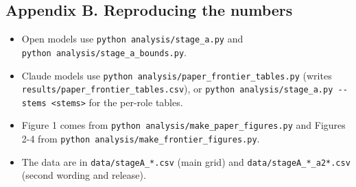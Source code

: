 \documentclass[
  11pt,
]{article}
\providecommand{\tightlist}{%
  \setlength{\itemsep}{0pt}\setlength{\parskip}{0pt}}
\begin{document}
\hypertarget{appendix-b.-reproducing-the-numbers}{%
\subsection{Appendix B. Reproducing the
numbers}\label{appendix-b.-reproducing-the-numbers}}

\begin{itemize}
\tightlist
\item
  Open models use \texttt{python\ analysis/stage\_a.py} and
  \texttt{python\ analysis/stage\_a\_bounds.py}.
\item
  Claude models use \texttt{python\ analysis/paper\_frontier\_tables.py}
  (writes \texttt{results/paper\_frontier\_tables.csv}), or
  \texttt{python\ analysis/stage\_a.py\ -\/-stems\ \textless{}stems\textgreater{}}
  for the per-role tables.
\item
  Figure 1 comes from \texttt{python\ analysis/make\_paper\_figures.py}
  and Figures 2-4 from
  \texttt{python\ analysis/make\_frontier\_figures.py}.
\item
  The data are in \texttt{data/stageA\_*.csv} (main grid) and
  \texttt{data/stageA\_*\_a2*.csv} (second wording and release).
\end{itemize}
\end{document}
